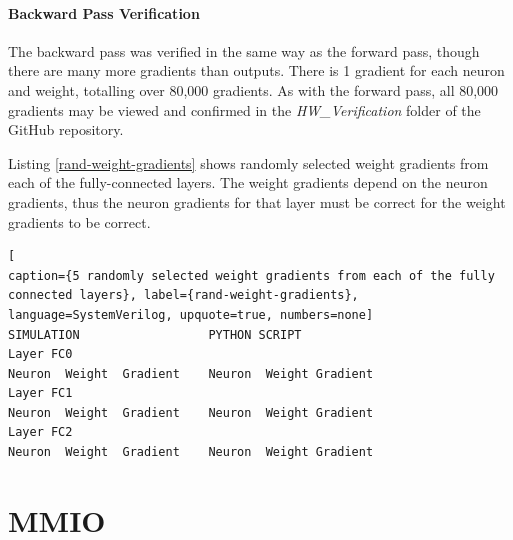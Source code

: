 \paragraph{Backward Pass Verification}
The backward pass was verified in the same way as the forward pass, though there are many more gradients than outputs. There is 1 gradient for each neuron and weight, totalling over 80,000 gradients. As with the forward pass, all 80,000 gradients may be viewed and confirmed in the \textit{HW\_Verification} folder of the GitHub repository.

Listing \ref{rand-weight-gradients} shows randomly selected weight gradients from each of the fully-connected layers. The weight gradients depend on the neuron gradients, thus the neuron gradients for that layer must be correct for the weight gradients to be correct.

\begin{lstlisting}[
caption={5 randomly selected weight gradients from each of the fully connected layers}, label={rand-weight-gradients}, language=SystemVerilog, upquote=true, numbers=none]
SIMULATION                  PYTHON SCRIPT
Layer FC0
Neuron	Weight	Gradient	Neuron	Weight Gradient
Layer FC1
Neuron	Weight	Gradient	Neuron	Weight Gradient
Layer FC2
Neuron	Weight	Gradient	Neuron	Weight Gradient
\end{lstlisting}

\section{MMIO}
